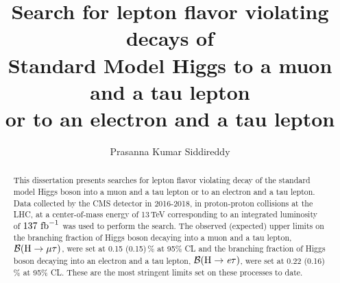 \documentclass[review,numrefs,sort&compress]{nddiss2e}
\begin{document}


\newlength\cmsTabSkip
\setlength\cmsTabSkip{2ex}


\frontmatter %

\title{Search for lepton flavor violating decays of \protect\\ Standard Model Higgs to a muon and a tau lepton \protect\\ or to an electron and a tau lepton}
\author{Prasanna Kumar Siddireddy}

\maketitle
%
%

{} %
\makecopyright

\begin{abstract}
This dissertation presents searches for lepton flavor violating decay of the standard model Higgs boson into a muon and a tau lepton or to an electron and a tau lepton. Data collected by the CMS detector in 2016-2018, in proton-proton collisions at the LHC, at a center-of-mass energy of 13\,TeV corresponding to an integrated luminosity of $137~\text{fb}^{-1}$ was used to perform the search. The observed (expected) upper limits on the branching fraction of Higgs boson decaying into a muon and a tau lepton, $\mathcal{B}(\text{H} \to \mu \tau)$, were set at 0.15 (0.15)\,\% at 95\% CL and the branching fraction of Higgs boson decaying into an electron and a tau lepton, $\mathcal{B}(\text{H} \to \textit{e} \tau)$, were set at 0.22 (0.16)\,\% at 95\% CL. These are the most stringent limits set on these processes to date.

\end{abstract}
\end{document}
